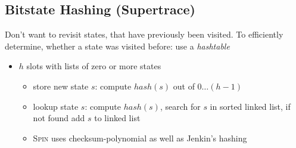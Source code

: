 \documentclass[a4paper, 10pt]{article}
\begin{document}
\subsection*{Bitstate Hashing (Supertrace)}
\begin{minipage}[]{0.48\textwidth}
Don't want to revisit states, that have previously been visited. To efficiently determine, whether a state was visited before: use a \emph{hashtable}
\begin{itemize}
    \item $h$ slots with lists of zero or more states
    \begin{itemize}
        \item store new state $s$: compute $hash(s)$ out of $0\dots (h-1)$
        \item lookup state $s$: compute $hash(s)$, search for $s$ in sorted linked list, if not found add $s$ to linked list
    \end{itemize}
    \begin{itemize}
        \item \textsc{Spin} uses checksum-polynomial as well as Jenkin's hashing
    \end{itemize}
\end{itemize}
\end{minipage}
\begin{minipage}[]{0.48\textwidth}
\begin{center}
\scalebox{.8}{}
\end{center}
\end{minipage}
\end{document}
